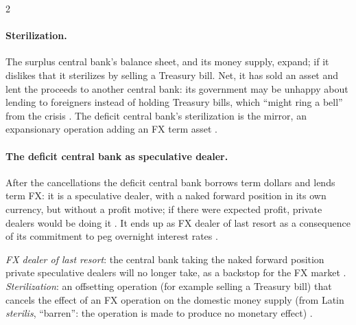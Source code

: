\begin{paracol}{2}
\paragraph{Sterilization.} The surplus central bank's balance sheet, and its money supply, expand; if it dislikes that it sterilizes by selling a Treasury bill.
Net, it has sold an asset and lent the proceeds to another central bank: its government may be unhappy about lending to foreigners instead of holding Treasury
bills, which ``might ring a bell'' from the crisis . The deficit
central bank's sterilization is the mirror, an expansionary operation adding an FX term asset .

\begin{nfigure}
\begin{taccts}
\qquad
{}
\end{taccts}
\caption{The central bank as FX dealer of last resort, net positions after sterilization .}\label{fig:fx-cb}
\end{nfigure}

\paragraph{The deficit central bank as speculative dealer.} After the cancellations the deficit central bank borrows term dollars and lends term FX: it is a
speculative dealer, with a naked forward position in its own currency, but without a profit motive; if there were expected profit, private dealers would be doing
it . It ends up as FX dealer of last resort as a consequence of its commitment to peg overnight
interest rates .

\begin{definition}
\emph{FX dealer of last resort}: the central bank taking the naked forward position private speculative dealers will no longer take, as a backstop for the FX
market . \emph{Sterilization}: an offsetting operation (for example selling a Treasury bill) that cancels the effect of an
FX operation on the domestic money supply (from Latin \emph{sterilis}, ``barren'': the operation is made to produce no monetary effect) .
\end{definition}


\end{paracol}
